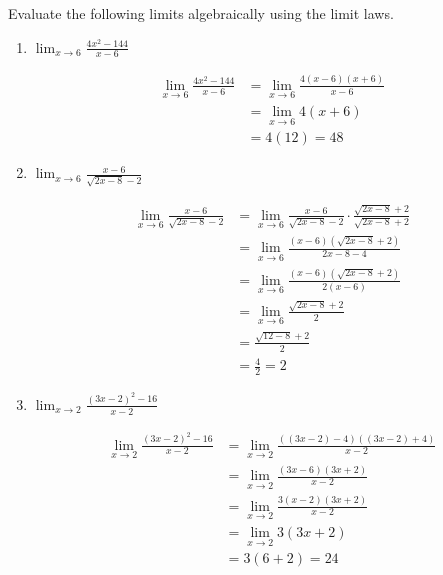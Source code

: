 \documentclass[handout,nooutcomes]{ximera}
\begin{document}
\begin{problem}
Evaluate the following limits algebraically using the limit laws.  
	
	\begin{enumerate}
	
	\item $ \lim_{x \to 6} \frac{4x^2 - 144}{x-6}  $
	\begin{freeResponse}
	\begin{align*}
	\lim_{x \to 6} \frac{4x^2 - 144}{x-6} &= \lim_{x \to 6} \frac{4(x-6)(x+6)}{x-6} \\
	&= \lim_{x \to 6} 4(x+6) \\
	&= 4(12) = 48  
	\end{align*}
	\end{freeResponse}
	
	
	\item  $ \lim_{x \to 6} \frac{x-6}{\sqrt{2x-8} - 2}  $
	\begin{freeResponse}
	\begin{align*}
	\lim_{x \to 6} \frac{x-6}{\sqrt{2x-8} - 2} &= \lim_{x \to 6} \frac{x-6}{\sqrt{2x-8} - 2} \cdot \frac{\sqrt{2x-8} + 2}{\sqrt{2x-8}+2} \\
	&= \lim_{x \to 6} \frac{(x-6)(\sqrt{2x-8} + 2)}{2x - 8 - 4} \\
	&= \lim_{x \to 6} \frac{(x-6)(\sqrt{2x-8} + 2)}{2(x-6)} \\
	&= \lim_{x \to 6} \frac{\sqrt{2x-8}+2}{2} \\
	&= \frac{\sqrt{12-8}+2}{2} \\
	&= \frac{4}{2} = 2
	\end{align*}
			
	\end{freeResponse}
	
	
	\item  $ \lim_{x \to 2} \frac{(3x-2)^2 - 16}{x-2}  $
	\begin{freeResponse}
	\begin{align*}
	\lim_{x \to 2} \frac{(3x-2)^2-16}{x-2} &=\lim_{x \to 2} \frac{((3x-2)-4)((3x-2)+4)}{x-2} \\
	&= \lim_{x \to 2} \frac{(3x-6)(3x+2)}{x-2} \\
	&= \lim_{x \to 2} \frac{3(x-2)(3x+2)}{x-2} \\
	&= \lim_{x \to 2} 3(3x+2)  \\
	&= 3(6+2) = 24   
	\end{align*}
	\end{freeResponse}
	

\end{enumerate}
\end{problem}
\end{document}
